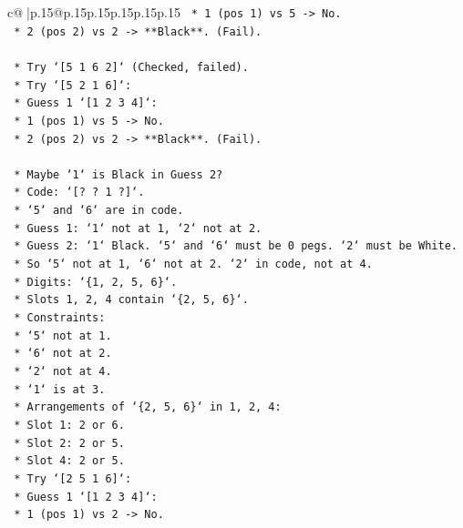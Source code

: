\documentclass{article}
\begin{document}
{\begin{supertabular}{c@{$\;$}|p{.15\linewidth}@{}p{.15\linewidth}p{.15\linewidth}p{.15\linewidth}p{.15\linewidth}p{.15\linewidth}}
{{{\texttt{            *   1 (pos 1) vs 5 {-}> No.} \\
\texttt{            *   2 (pos 2) vs 2 {-}> **Black**. (Fail).} \\
\\ 
\texttt{    *   Try `{[}5 1 6 2{]}` (Checked, failed).} \\
\texttt{    *   Try `{[}5 2 1 6{]}`:} \\
\texttt{        *   Guess 1 `{[}1 2 3 4{]}`:} \\
\texttt{            *   1 (pos 1) vs 5 {-}> No.} \\
\texttt{            *   2 (pos 2) vs 2 {-}> **Black**. (Fail).} \\
\\ 
\texttt{    *   Maybe `1` is Black in Guess 2?} \\
\texttt{        *   Code: `{[}? ? 1 ?{]}`.} \\
\texttt{        *   `5` and `6` are in code.} \\
\texttt{        *   Guess 1: `1` not at 1, `2` not at 2.} \\
\texttt{        *   Guess 2: `1` Black. `5` and `6` must be 0 pegs. `2` must be White.} \\
\texttt{        *   So `5` not at 1, `6` not at 2. `2` in code, not at 4.} \\
\texttt{        *   Digits: `\{1, 2, 5, 6\}`.} \\
\texttt{        *   Slots 1, 2, 4 contain `\{2, 5, 6\}`.} \\
\texttt{        *   Constraints:} \\
\texttt{            *   `5` not at 1.} \\
\texttt{            *   `6` not at 2.} \\
\texttt{            *   `2` not at 4.} \\
\texttt{            *   `1` is at 3.} \\
\texttt{        *   Arrangements of `\{2, 5, 6\}` in 1, 2, 4:} \\
\texttt{            *   Slot 1: 2 or 6.} \\
\texttt{            *   Slot 2: 2 or 5.} \\
\texttt{            *   Slot 4: 2 or 5.} \\
\texttt{            *   Try `{[}2 5 1 6{]}`:} \\
\texttt{                *   Guess 1 `{[}1 2 3 4{]}`:} \\
\texttt{                    *   1 (pos 1) vs 2 {-}> No.} \\
}}}
\end{supertabular}}
\end{document}
